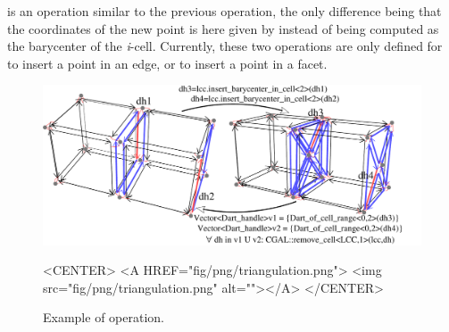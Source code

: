  is an operation
similar to the previous operation, the only difference being that the
coordinates of the new point is here given by  instead of being
computed as the barycenter of the \emph{i}-cell.  Currently, these two
operations are only defined for  to insert a point in an
edge, or  to insert a point in a facet.
%
\begin{figure}[htb]
  \begin{ccTexOnly}
    \centerline{\includegraphics[width=.85\textwidth]
      {Linear_cell_complex/fig/pdf/triangulation}}
  \end{ccTexOnly}
  \begin{ccHtmlOnly}
    <CENTER> <A HREF="fig/png/triangulation.png"> <img
    src="fig/png/triangulation.png" alt=""></A> </CENTER>
  \end{ccHtmlOnly}
  \caption{Example of  operation.}
  \label{fig-lcc-triangulate}
\end{figure}
%

